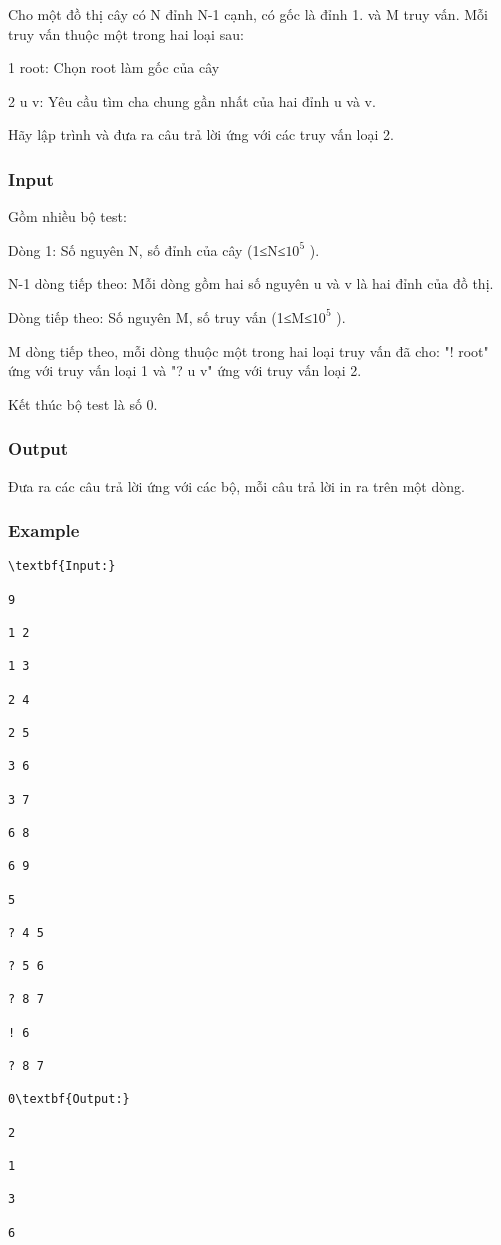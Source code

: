 



   Cho một đồ thị cây có N đỉnh N-1 cạnh, có gốc là đỉnh 1. và M truy vấn. Mỗi truy vấn thuộc một trong hai loại sau:  

   1 root: Chọn root làm gốc của cây  

   2 u v: Yêu cầu tìm cha chung gần nhất của hai đỉnh u và v.  

   Hãy lập trình và đưa ra câu trả lời ứng với các truy vấn loại 2.  

\subsubsection{   Input  }

   Gồm nhiều bộ test:  

   Dòng 1: Số nguyên N, số đỉnh của cây (1≤N≤$10^{5}$   ).  

   N-1 dòng tiếp theo: Mỗi dòng gồm hai số nguyên u và v là hai đỉnh của đồ thị.  

   Dòng tiếp theo: Số nguyên M, số truy vấn (1≤M≤$10^{5}$   ).  

   M dòng tiếp theo, mỗi dòng thuộc một trong hai loại truy vấn đã cho: "! root" ứng với truy vấn loại 1 và "? u v" ứng với truy vấn loại 2.  

   Kết thúc bộ test là số 0.  

\subsubsection{   Output  }

   Đưa ra các câu trả lời ứng với các bộ, mỗi câu trả lời in ra trên một dòng.  

\subsubsection{   Example  }
\begin{verbatim}
\textbf{Input:}

9

1 2

1 3

2 4

2 5

3 6

3 7

6 8

6 9

5

? 4 5

? 5 6

? 8 7

! 6

? 8 7

0\textbf{Output:}

2

1

3

6\end{verbatim}
